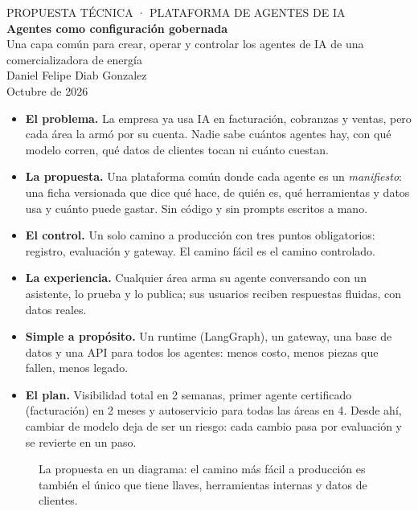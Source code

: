 \thispagestyle{empty}
\begin{center}
  {\sffamily\small\color{docacento} PROPUESTA TÉCNICA · PLATAFORMA DE AGENTES DE IA}\\[10pt]
  {\sffamily\bfseries\LARGE\color{docink} Agentes como configuración gobernada}\\[6pt]
  {\sffamily\Large\color{docink} Una capa común para crear, operar y controlar los agentes de IA de una comercializadora de energía}\\[14pt]
  {\sffamily\normalsize Daniel Felipe Diab Gonzalez}\\[2pt]
  {\sffamily\small\color{docgris} Octubre de 2026}
\end{center}
\vspace{4pt}

\begin{tesis}
\begin{itemize}[leftmargin=1.1em]
  \item \textbf{El problema.} La empresa ya usa IA en facturación, cobranzas y ventas, pero cada área
  la armó por su cuenta. Nadie sabe cuántos agentes hay, con qué modelo corren, qué datos de
  clientes tocan ni cuánto cuestan.
  \item \textbf{La propuesta.} Una plataforma común donde cada agente es un
  \emph{manifiesto}: una ficha versionada que dice qué hace, de quién es, qué herramientas y
  datos usa y cuánto puede gastar. Sin código y sin prompts escritos a mano.
  \item \textbf{El control.} Un solo camino a producción con tres puntos obligatorios:
  registro, evaluación y gateway. El camino fácil es el camino controlado.
  \item \textbf{La experiencia.} Cualquier área arma su agente conversando con un asistente,
  lo prueba y lo publica; sus usuarios reciben respuestas fluidas, con datos reales.
  \item \textbf{Simple a propósito.} Un runtime (LangGraph), un gateway, una base de datos y una
  API para todos los agentes: menos costo, menos piezas que fallen, menos legado.
  \item \textbf{El plan.} Visibilidad total en 2 semanas, primer agente certificado
  (facturación) en 2 meses y autoservicio para todas las áreas en 4. Desde ahí, cambiar de
  modelo deja de ser un riesgo: cada cambio pasa por evaluación y se revierte en un paso.
\end{itemize}
\end{tesis}

\begin{figure}[h]
  \centering
  
  \caption{La propuesta en un diagrama: el camino más fácil a producción es también el único
  que tiene llaves, herramientas internas y datos de clientes.}
  \label{fig:tesis}
\end{figure}



\newpage
{\small\setlength{\parskip}{1pt}\tableofcontents}
\vspace{6pt}
